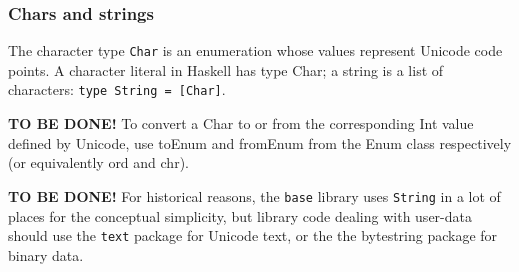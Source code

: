 %

\subsubsection{Chars and strings}
The character type \texttt{Char} is an enumeration whose values represent Unicode code points.
A character literal in Haskell has type Char; a string is a list of characters: \texttt{type String = [Char]}.

\textbf{TO BE DONE!}
To convert a Char to or from the corresponding Int value defined by Unicode, use toEnum and fromEnum from the Enum class respectively (or equivalently ord and chr).

\textbf{TO BE DONE!}
For historical reasons, the \texttt{base} library uses \texttt{String} in a lot of places for the conceptual simplicity, but library code dealing with user-data should use the \texttt{text} package for Unicode text, or the the bytestring package for binary data.

%